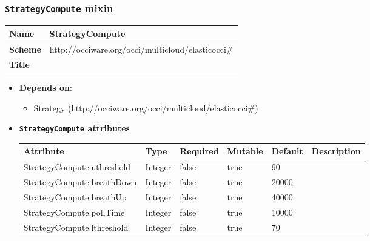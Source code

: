  
\subsubsection{\texttt{StrategyCompute} mixin}
\begin{center}
\begin{tabular}{|l|l|}
  \hline
  \textbf{Name} & StrategyCompute \\
  \hline  
  \textbf{Scheme} & http://occiware.org/occi/multicloud/elasticocci\# \\
  \hline
  \textbf{Title} &  \\
  \hline
\end{tabular}
\end{center}

\begin{itemize}
\item \textbf{Depends on}:
\begin{itemize}
	\item Strategy (http://occiware.org/occi/multicloud/elasticocci\#)
\end{itemize}
\end{itemize}

\begin{itemize}
\item \textbf{\texttt{StrategyCompute} attributes}

\begin{tabularx}{\textwidth}{|l|l|p{1.4cm}|p{1.3cm}|l|X|}
  \hline
  \textbf{Attribute} & \textbf{Type} & \textbf{Required} & \textbf{Mutable} & \textbf{Default} & \textbf{Description} \\
  \hline  
  StrategyCompute.uthreshold & Integer & false & true & 90 &  \\
  \hline
  StrategyCompute.breathDown & Integer & false & true & 20000 &  \\
  \hline
  StrategyCompute.breathUp & Integer & false & true & 40000 &  \\
  \hline
  StrategyCompute.pollTime & Integer & false & true & 10000 &  \\
  \hline
  StrategyCompute.lthreshold & Integer & false & true & 70 &  \\
  \hline
\end{tabularx}
\end{itemize}


 

